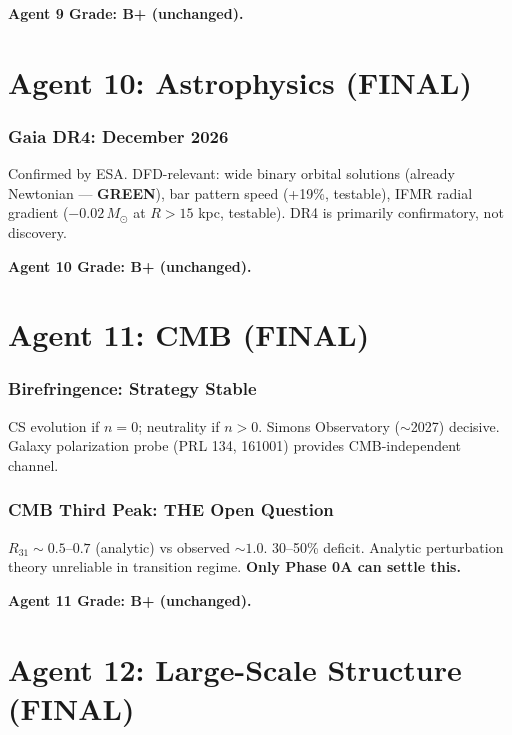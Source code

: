 \documentclass[11pt,a4paper]{article}
\newcommand{\GREEN}{\textcolor{dfdgreen}{\textbf{GREEN}}}
\begin{document}
\textbf{Agent 9 Grade: B+ (unchanged).}


\part{Agent 10: Astrophysics (FINAL)}
\label{part:agent10}

\section{Gaia DR4: December 2026}

Confirmed by ESA. DFD-relevant: wide binary orbital solutions (already Newtonian --- \GREEN), bar pattern speed (+19\%, testable), IFMR radial gradient ($-0.02\,M_\odot$ at $R > 15$ kpc, testable). DR4 is primarily confirmatory, not discovery.

\textbf{Agent 10 Grade: B+ (unchanged).}


\part{Agent 11: CMB (FINAL)}
\label{part:agent11}

\section{Birefringence: Strategy Stable}

CS evolution if $n = 0$; neutrality if $n > 0$. Simons Observatory ($\sim$2027) decisive. Galaxy polarization probe (PRL 134, 161001) provides CMB-independent channel.

\section{CMB Third Peak: THE Open Question}

$R_{31} \sim 0.5$--$0.7$ (analytic) vs observed $\sim 1.0$. 30--50\% deficit. Analytic perturbation theory unreliable in transition regime. \textbf{Only Phase 0A can settle this.}

\textbf{Agent 11 Grade: B+ (unchanged).}


\part{Agent 12: Large-Scale Structure (FINAL)}
\label{part:agent12}
\end{document}
